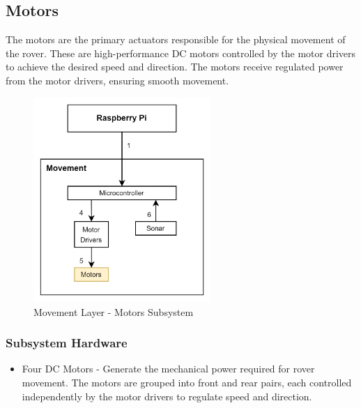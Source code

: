 
\subsection{Motors}
The motors are the primary actuators responsible for the physical movement of the rover. These are high-performance DC motors controlled by the motor drivers to achieve the desired speed and direction. The motors receive regulated power from the motor drivers, ensuring smooth movement.

\begin{figure}[h!]
\centering
\includegraphics[width=0.60\textwidth]{images/movement/3_motors.jpg}
\caption{Movement Layer - Motors Subsystem}
\end{figure}

\subsubsection{Subsystem Hardware}
\begin{itemize}
\item Four DC Motors - Generate the mechanical power required for rover movement. The motors are grouped into front and rear pairs, each controlled independently by the motor drivers to regulate speed and direction.
\end{itemize}
\newpage




